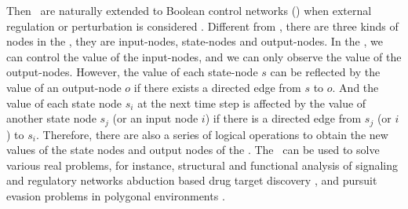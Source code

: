 Then \BNs\ are naturally extended to Boolean control networks (\BCNs) when external regulation or perturbation is considered \cite{Ideker2001A}. Different from \BNs, there are three kinds of nodes in the \BCNs, they are input-nodes, state-nodes and output-nodes. In the \BCNs, we can control the value of the input-nodes, and we can only observe the value of the output-nodes. However, the value of each state-node $s$ can be reflected by the value of an output-node $o$ if there exists a directed edge from $s$ to $o$. And the value of each state node $s_i$ at the next time step is affected by the value of another state node $s_j$ (or an input node $i$) if there is a directed edge from $s_j$ (or $i$) to $s_i$. Therefore, there are also a series of logical operations to obtain the new values of the state nodes and output nodes of the \BCNs. The \BCNs\ can be used to solve various real problems, for instance, %
structural and functional analysis of signaling and regulatory networks \cite{Kaufman1999A, Klamt2006A}
abduction based drug target discovery \cite{Biane2017Abduction}, %
and pursuit evasion problems in polygonal environments \cite{Thunberg2011A}. %
